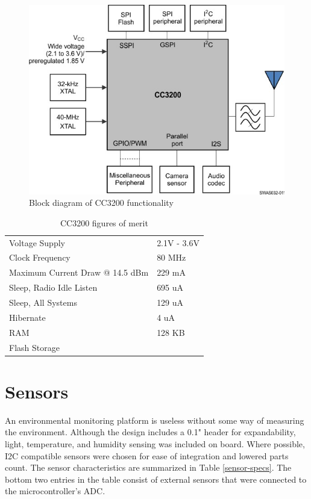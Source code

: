 \begin{figure}[h]
\centering
\includegraphics[width=0.5\linewidth]{images/cc3200-block}
\caption[CC3200 Block Diagram]{Block diagram of CC3200 functionality\cite{2015}}
\label{fig:cc3200-block}
\end{figure}

\begin{table}[h]
\caption{CC3200 figures of merit}
\label{CC3200-fom}
\begin{tabular}{@{}l|l@{}}
\toprule
Voltage Supply                  & 2.1V - 3.6V \\
Clock Frequency                 & 80 MHz      \\
Maximum Current Draw @ 14.5 dBm & 229 mA      \\
Sleep, Radio Idle Listen        & 695 uA      \\
Sleep, All Systems              & 129 uA      \\
Hibernate                       & 4 uA        \\
RAM                             & 128 KB      \\
Flash Storage                   &             \\ \bottomrule
\end{tabular}
\end{table}

\section{Sensors}

An environmental monitoring platform is useless without some way of measuring the environment. Although the design includes a 0.1" header for expandability, light, temperature, and humidity sensing was included on board. Where possible, I2C compatible sensors were chosen for ease of integration and lowered parts count. The sensor characteristics are summarized in Table \ref{sensor-specs}. The bottom two entries in the table consist of external sensors that were connected to the microcontroller's ADC. 

